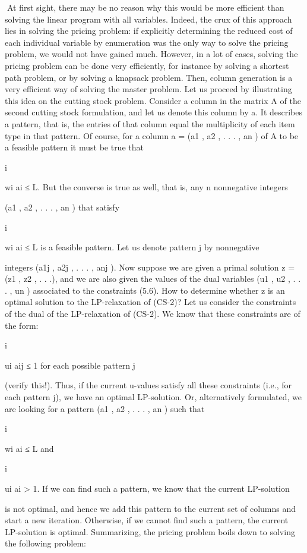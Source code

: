 At first sight, there may be no reason why this would be more efficient than solving the linear program
with all variables. Indeed, the crux of this approach lies in solving the pricing problem: if explicitly
determining the reduced cost of each individual variable by enumeration was the only way to solve the
pricing problem, we would not have gained much. However, in a lot of cases, solving the pricing problem
can be done very efficiently, for instance by solving a shortest path problem, or by solving a knapsack
problem. Then, column generation is a very efficient way of solving the master problem. Let us proceed
by illustrating this idea on the cutting stock problem.
Consider a column in the matrix A of the second cutting stock formulation, and let us denote this
column by a. It describes a pattern, that is, the entries of that column equal the multiplicity of each
item type in that pattern. Of course, for a column a = (a1 , a2 , . . . , an ) of A to be a feasible pattern it
must be true that

i

wi ai ≤ L. But the converse is true as well, that is, any n nonnegative integers

(a1 , a2 , . . . , an ) that satisfy

i

wi ai ≤ L is a feasible pattern. Let us denote pattern j by nonnegative

integers (a1j , a2j , . . . , anj ).
Now suppose we are given a primal solution z = (z1 , z2 , . . .), and we are also given the values of the dual
variables (u1 , u2 , . . . , un ) associated to the constraints (5.6). How to determine whether z is an optimal
solution to the LP-relaxation of (CS-2)? Let us consider the constraints of the dual of the LP-relaxation
of (CS-2). We know that these constraints are of the form:

i

ui aij ≤ 1 for each possible pattern j

(verify this!). Thus, if the current u-values satisfy all these constraints (i.e., for each pattern j), we have
an optimal LP-solution. Or, alternatively formulated, we are looking for a pattern (a1 , a2 , . . . , an ) such
that

i

wi ai ≤ L and

i

ui ai > 1. If we can find such a pattern, we know that the current LP-solution

is not optimal, and hence we add this pattern to the current set of columns and start a new iteration.
Otherwise, if we cannot find such a pattern, the current LP-solution is optimal. Summarizing, the pricing
problem boils down to solving the following problem:

